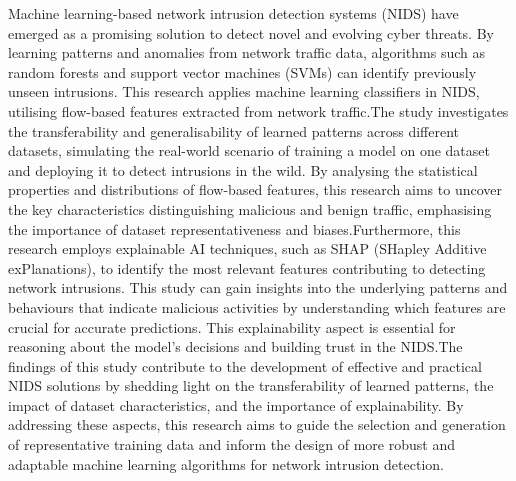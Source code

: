 Machine learning-based network intrusion detection systems (NIDS) have emerged as a promising solution to detect novel and evolving cyber threats. By learning patterns and anomalies from network traffic data, algorithms such as random forests and support vector machines (SVMs) can identify previously unseen intrusions. This research applies machine learning classifiers in NIDS, utilising flow-based features extracted from network traffic.\@ The study investigates the transferability and generalisability of learned patterns across different datasets, simulating the real-world scenario of training a model on one dataset and deploying it to detect intrusions in the wild. By analysing the statistical properties and distributions of flow-based features, this research aims to uncover the key characteristics distinguishing malicious and benign traffic, emphasising the importance of dataset representativeness and biases.\@ Furthermore, this research employs explainable AI techniques, such as SHAP (SHapley Additive exPlanations), to identify the most relevant features contributing to detecting network intrusions. This study can gain insights into the underlying patterns and behaviours that indicate malicious activities by understanding which features are crucial for accurate predictions. This explainability aspect is essential for reasoning about the model's decisions and building trust in the NIDS.\@ The findings of this study contribute to the development of effective and practical NIDS solutions by shedding light on the transferability of learned patterns, the impact of dataset characteristics, and the importance of explainability. By addressing these aspects, this research aims to guide the selection and generation of representative training data and inform the design of more robust and adaptable machine learning algorithms for network intrusion detection.